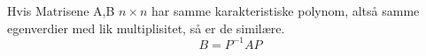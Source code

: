 Hvis Matrisene A,B $n\times n$ har samme karakteristiske polynom,
altså samme egenverdier med lik multiplisitet,
så er de similære.
$$B = P^{-1}AP$$
